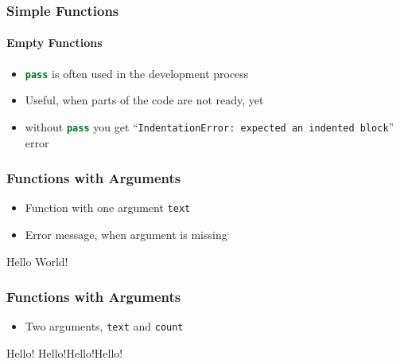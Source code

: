 \documentclass[english]{beamer}
\newcommand{\ta}[1]{\textattachfile[color=1 0 0]{#1}{Code}}
\begin{document}
\begin{frame}[containsverbatim]
\frametitle{Simple Functions}
\framesubtitle{Empty Functions}

\begin{itemize}
\item \lstinline[language={Python}]{pass} is often used in the development process
\item Useful, when parts of the code are not ready, yet
\item without \lstinline[language={Python}]{pass} you get  \enquote{\texttt{IndentationError: expected an indented block}} error
\end{itemize}



\end{frame}





\begin{frame}[containsverbatim]
\frametitle{Functions with Arguments}

\begin{itemize}
	\item Function with one argument \texttt{text} 
	\item Error message, when argument is missing
\end{itemize}



\begin{ausgabe}
Hello World!
\end{ausgabe}

\end{frame}



\begin{frame}[containsverbatim]
\frametitle{Functions with Arguments}

\begin{itemize}
	\item Two arguments, \texttt{text} and \texttt{count}
\end{itemize}



\begin{ausgabe}

Hello!
Hello!Hello!Hello!

\end{ausgabe}

\end{frame}
\end{document}
